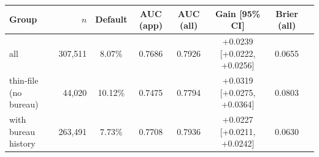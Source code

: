 \begin{tabular}{lrcccccc}
\toprule
Group & $n$ & Default & AUC (app) & AUC (all) & Gain [95\% CI] & Brier (all)\\
\midrule
all & 307,511 & 8.07\% & 0.7686 & 0.7926 & +0.0239 [+0.0222, +0.0256] & 0.0655\\
thin-file (no bureau) & 44,020 & 10.12\% & 0.7475 & 0.7794 & +0.0319 [+0.0275, +0.0364] & 0.0803\\
with bureau history & 263,491 & 7.73\% & 0.7708 & 0.7936 & +0.0227 [+0.0211, +0.0242] & 0.0630\\
\bottomrule
\end{tabular}
